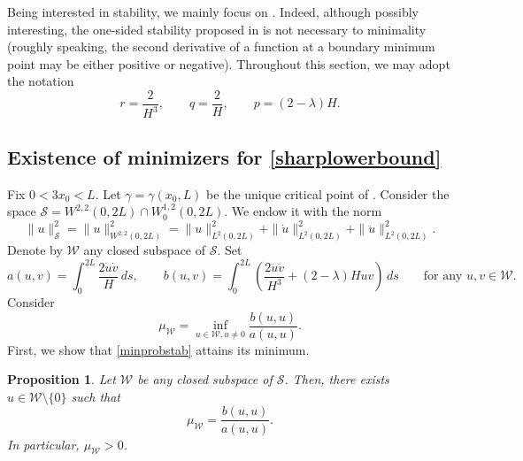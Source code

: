 \documentclass[11pt]{amsart}
\renewcommand{\leq}{\leqslant}
\newcommand{\A}{\mathcal A}
\newcommand{\F}{\mathcal F}
\newtheorem{proposition}[theorem]{Proposition}
\theoremstyle{definition}
\theoremstyle{remark}
\numberwithin{equation}{section}
\begin{document}
Being interested in stability, we mainly focus on . Indeed, although possibly interesting, the one-sided stability proposed in  is not necessary to minimality (roughly speaking, the second derivative of a function at a boundary minimum point may be either positive or negative). Throughout this section, we may adopt the notation
\begin{equation*}
r=\frac{2}{H^3},\qquad q=\frac{2}{H},\qquad p=(2-\lambda) H.
\end{equation*}
\subsection{Existence of minimizers for \eqref{sharplowerbound}} \label{sec_exminprob}
Fix $0<3x_0<L$. Let $\gamma=\gamma(x_0,L)$ be the unique critical point of . Consider the space $\mathcal S=W^{2,2}(0,2L)\cap W^{1,2}_0(0,2L)$. We endow it with the norm 
\begin{equation*}
\|u\|^2_{\mathcal S}=\|u\|^2_{W^{2,2}(0,2L)}=\|u\|^2_{L^2(0,2L)}+\|\dot u\|^2_{L^2(0,2L)}+\|\ddot u\|^2_{L^2(0,2L)}.
\end{equation*}
Denote by $\mathcal W$ any closed subspace of $\mathcal S$. 
Set 
\begin{equation*}
a(u,v)=\int_0^{2L}\frac{2\dot u\dot v}{H}\,ds,\qquad    b(u,v)=\int_0^{2L}\left(\frac{2\ddot u\ddot v}{H^3}+(2-\lambda)H u v\right)\,ds\qquad\text{for any $u,v\in \mathcal W$.}
\end{equation*}
Consider 
\begin{equation}\label{minprobstab}
\mu_{\mathcal W}=\inf_{u\in\mathcal W,u\neq 0}\frac{b(u,u)}{a(u,u)}.
\end{equation}
First, we show that \eqref{minprobstab} attains its minimum.
\begin{proposition}\label{exminstab}
Let $\mathcal W$ be any closed subspace of $\mathcal S$.   Then, there exists $u\in\mathcal W\setminus\{0\}$ such that
\begin{equation*}
	\mu_{\mathcal W}=\frac{b(u,u)}{a(u,u)}.
\end{equation*}
In particular, $\mu_{\mathcal W}>0$.
\end{proposition}
\end{document}
